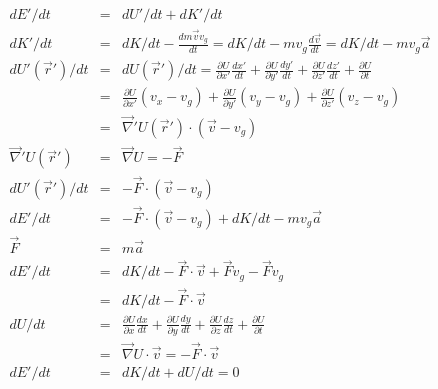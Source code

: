 \documentclass[11pt]{amsart}
\begin{document}
\begin{eqnarray*}
dE'/dt &=& dU'/dt+dK'/dt \\
dK'/dt &=& dK/dt-\frac{dm\vec{v}v_{g}}{dt} = dK/dt-mv_{g}\frac{d\vec{v}}{dt} = dK/dt-mv_{g}\vec{a} \\
dU'(\vec{r}')/dt &=& dU(\vec{r}')/dt = \frac{\partial{U}}{\partial{x'}}\frac{dx'}{dt}+\frac{\partial{U}}{\partial{y'}}\frac{dy'}{dt}+\frac{\partial{U}}{\partial{z'}}\frac{dz'}{dt}+\frac{\partial{U}}{\partial{t}} \\
&=& \frac{\partial{U}}{\partial{x'}}(v_{x}-v_{g})+\frac{\partial{U}}{\partial{y'}}(v_{y}-v_{g})+\frac{\partial{U}}{\partial{z'}}(v_{z}-v_{g}) \\
&=& \vec{\nabla}'U(\vec{r}')\cdot{(\vec{v}-v_{g})} \\
\vec{\nabla}'U(\vec{r}') &=& \vec{\nabla}U = -\vec{F} \\
dU'(\vec{r}')/dt &=& -\vec{F}\cdot{(\vec{v}-v_{g})} \\
dE'/dt &=& -\vec{F}\cdot{(\vec{v}-v_{g})}+dK/dt-mv_{g}\vec{a} \\
\vec{F} &=& m\vec{a} \\
dE'/dt &=& dK/dt -\vec{F}\cdot{\vec{v}}+\vec{F}v_{g}-\vec{F}v_{g} \\
&=& dK/dt-\vec{F}\cdot{\vec{v}}\\
dU/dt &=& \frac{\partial{U}}{\partial{x}}\frac{dx}{dt}+\frac{\partial{U}}{\partial{y}}\frac{dy}{dt}+\frac{\partial{U}}{\partial{z}}\frac{dz}{dt}+\frac{\partial{U}}{\partial{t}} \\
&=& \vec{\nabla}U\cdot{\vec{v}} = -\vec{F}\cdot{\vec{v}} \\
dE'/dt &=& dK/dt+dU/dt =0 
\end{eqnarray*} \\
\end{document}
